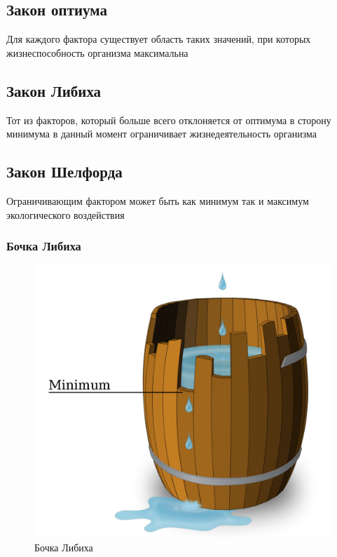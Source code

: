 \subsection{Закон оптиума}

Для каждого фактора существует область таких значений, при которых
жизнеспособность организма максимальна

\subsection{Закон Либиха}

Тот из факторов, который больше всего отклоняется от оптимума в сторону
минимума в данный момент ограничивает жизнедеятельность организма

\subsection{Закон Шелфорда}

Ограничивающим фактором может быть как минимум так и максимум
экологического воздействия

\subsubsection{Бочка Либиха}

\begin{figure}[H]
    \centering
    \includegraphics[scale=0.15]{img/libih.png}
    \caption{Бочка Либиха}
\end{figure}

